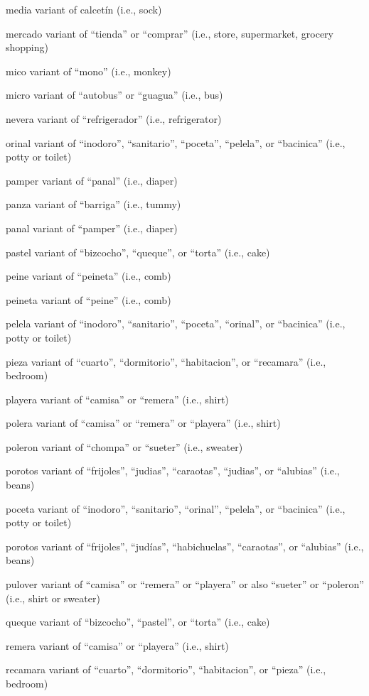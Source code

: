 \documentclass[
  12pt,
]{book}
\begin{document}
media
variant of calcetín (i.e., sock)

mercado
variant of ``tienda'' or ``comprar'' (i.e., store, supermarket, grocery shopping)

mico
variant of ``mono'' (i.e., monkey)

micro
variant of ``autobus'' or ``guagua'' (i.e., bus)

nevera
variant of ``refrigerador'' (i.e., refrigerator)

orinal
variant of ``inodoro'', ``sanitario'', ``poceta'', ``pelela'', or ``bacinica'' (i.e., potty or toilet)

pamper
variant of ``panal'' (i.e., diaper)

panza
variant of ``barriga'' (i.e., tummy)

panal
variant of ``pamper'' (i.e., diaper)

pastel
variant of ``bizcocho'', ``queque'', or ``torta'' (i.e., cake)

peine
variant of ``peineta'' (i.e., comb)

peineta
variant of ``peine'' (i.e., comb)

pelela
variant of ``inodoro'', ``sanitario'', ``poceta'', ``orinal'', or ``bacinica'' (i.e., potty or toilet)

pieza
variant of ``cuarto'', ``dormitorio'', ``habitacion'', or ``recamara'' (i.e., bedroom)

playera
variant of ``camisa'' or ``remera'' (i.e., shirt)

polera
variant of ``camisa'' or ``remera'' or ``playera'' (i.e., shirt)

poleron
variant of ``chompa'' or ``sueter'' (i.e., sweater)

porotos
variant of ``frijoles'', ``judias'', ``caraotas'', ``judias'', or ``alubias'' (i.e., beans)

poceta
variant of ``inodoro'', ``sanitario'', ``orinal'', ``pelela'', or ``bacinica'' (i.e., potty or toilet)

porotos
variant of ``frijoles'', ``judías'', ``habichuelas'', ``caraotas'', or ``alubias'' (i.e., beans)

pulover
variant of ``camisa'' or ``remera'' or ``playera'' or also ``sueter'' or ``poleron'' (i.e., shirt or sweater)

queque
variant of ``bizcocho'', ``pastel'', or ``torta'' (i.e., cake)

remera
variant of ``camisa'' or ``playera'' (i.e., shirt)

recamara
variant of ``cuarto'', ``dormitorio'', ``habitacion'', or ``pieza'' (i.e., bedroom)
\end{document}
